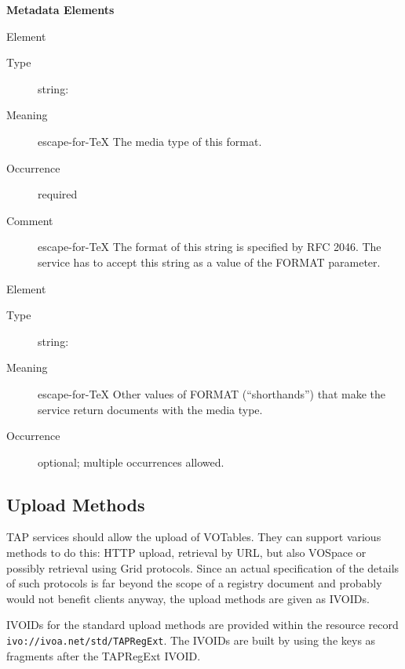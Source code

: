 \documentclass{ivoa}
\begin{document}
\vspace{0.5ex}\noindent\textbf{ Metadata Elements}

\begingroup\small\begin{bigdescription}\item[Element \xmlel{mime}]
\begin{description}
\item[Type] string: 
\item[Meaning] escape-for-TeX{{{
          The media type of this format.
          }}}
\item[Occurrence] required
\item[Comment] escape-for-TeX{{{
          The format of this string is specified by RFC 2046.
          The service has to accept this string as a 
          value of the FORMAT parameter.
          }}}

\end{description}
\item[Element \xmlel{alias}]
\begin{description}
\item[Type] string: 
\item[Meaning] escape-for-TeX{{{
          Other values of FORMAT (“shorthands”) that make the service return 
          documents with the media type.
          }}}
\item[Occurrence] optional; multiple occurrences allowed.

\end{description}


\end{bigdescription}\endgroup

\endgroup

\subsection{Upload Methods}

\label{uploadmethods}

TAP services should allow the upload of VOTables.  They can support
various methods to do this: HTTP upload, retrieval by URL, but also VOSpace
or possibly retrieval using Grid protocols.  Since an actual specification
of the details of such protocols is far beyond the scope of a registry
document and probably would not benefit clients anyway, the upload
methods are given as IVOIDs.

IVOIDs for the standard upload methods are provided within the
resource record
\texttt{ivo://ivoa.net/std/TAPRegExt}.  
The IVOIDs are built by using the keys as fragments after the 
TAPRegExt IVOID.
\end{document}
